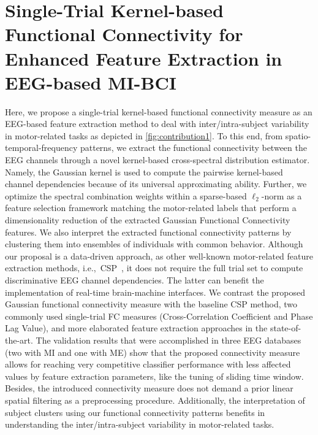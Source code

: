 \chapter[Kernel-based Functional Connectivity]{Single-Trial Kernel-based Functional Connectivity for Enhanced Feature Extraction in EEG-based MI-BCI}

Here, we propose a single-trial kernel-based functional connectivity measure as an EEG-based feature extraction method to deal with inter/intra-subject variability in motor-related tasks as depicted in \cref{fig:contribution1}. To this end, from spatio-temporal-frequency patterns, we extract the functional connectivity between the EEG channels through a novel kernel-based cross-spectral distribution estimator. Namely, the Gaussian kernel is used to compute the pairwise kernel-based channel dependencies because of its universal approximating ability. Further, we optimize the spectral combination weights within a sparse-based $\ell_2$-norm as a feature selection framework matching the motor-related labels that perform a dimensionality reduction of the extracted Gaussian Functional Connectivity features. We also interpret the extracted functional connectivity patterns by clustering them into ensembles of individuals with common behavior. Although our proposal is a data-driven approach, as other well-known motor-related feature extraction methods, i.e.,~CSP~\cite{FU2020}, it does not require the full trial set to compute discriminative EEG channel dependencies. The latter can benefit the implementation of real-time brain-machine interfaces. We contrast the proposed Gaussian functional connectivity measure with the baseline CSP method, two commonly used single-trial FC measures (Cross-Correlation Coefficient and Phase Lag Value), and more elaborated feature extraction approaches in the state-of-the-art. The validation results that were accomplished in three EEG databases (two with MI and one with ME) show that the proposed connectivity measure allows for reaching very competitive classifier performance with less affected values by feature extraction parameters, like the tuning of sliding time window. Besides, the introduced connectivity measure does not demand a prior linear spatial filtering as a preprocessing procedure. Additionally, the interpretation of subject clusters using our functional connectivity patterns benefits in understanding the inter/intra-subject variability in motor-related tasks.

